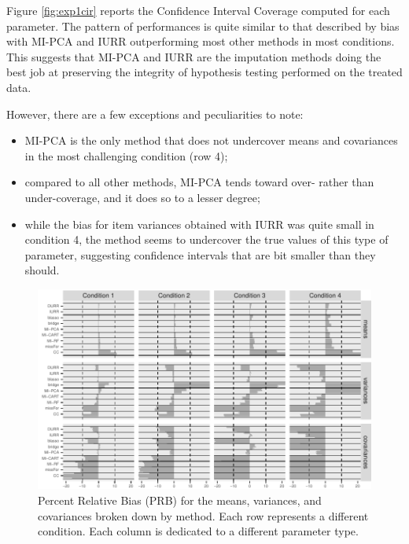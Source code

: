 	Figure \ref{fig:exp1cir} reports the Confidence Interval Coverage computed for each parameter.
	The pattern of performances is quite similar to that described by bias with MI-PCA and IURR 
	outperforming most other methods in most conditions.
	This suggests that MI-PCA and IURR are the imputation methods doing the best job at preserving
	the integrity of hypothesis testing performed on the treated data.

	However, there are a few exceptions and peculiarities to note: 
	\begin{itemize}
	\item MI-PCA is the only method that does not undercover means and covariances in the most challenging condition
		(row 4);
	\item compared to all other methods, MI-PCA tends toward over- rather than under-coverage, and it 
	does so to a lesser degree;
	\item while the bias for item variances obtained with IURR was quite small in condition 4, the method seems 
	to undercover the true values of this type of parameter, suggesting confidence intervals that are bit smaller
	than they should.
	\end{itemize}

\begin{figure}
	\includegraphics{../../output/graphs/exp1_bias.pdf}
\caption{Percent Relative Bias (PRB) for the means, variances, and covariances broken 
	down by method. 
	Each row represents a different condition. 
	Each column is dedicated to a different parameter type.}
\label{fig:exp1bias}
\end{figure}

